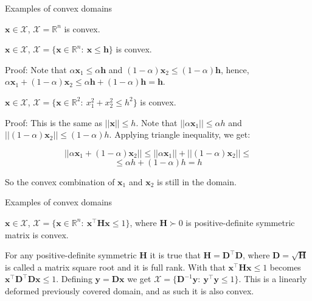\documentclass{beamer}
\begin{document}
\begin{frame}{Examples of convex domains}
	\begin{flushleft}
		
		$\mathbf{x} \in \mathcal{X}$, $\mathcal{X} = \mathbb{R}^n$  is convex.
		
		\bigskip
		
		$\mathbf{x} \in \mathcal{X}$, $\mathcal{X} = \{ \mathbf{x} \in \mathbb{R}^n: \ \mathbf{x} \leq \mathbf{h} \}$ is convex.
		
		\bigskip
		
		Proof: Note that $\alpha \mathbf{x}_1 \leq \alpha \mathbf{h}$ and $(1 - \alpha) \mathbf{x}_2 \leq (1 - \alpha) \mathbf{h}$, hence, $\alpha \mathbf{x}_1 + (1 - \alpha) \mathbf{x}_2 \leq 
		\alpha \mathbf{h} + (1 - \alpha) \mathbf{h} = \mathbf{h}$. \qedsymbol
		
		\bigskip
		
		$\mathbf{x} \in \mathcal{X}$, $\mathcal{X} = \{ \mathbf{x} \in \mathbb{R}^2: \ x_1^2+x_2^2 \leq h^2 \}$ is convex.
		
		\bigskip
		
		Proof: This is the same as $|| \mathbf{x} || \leq h$. Note that $|| \alpha \mathbf{x}_1 || \leq \alpha h$ and $|| (1 - \alpha) \mathbf{x}_2 || \leq (1 - \alpha) h$. Applying triangle inequality, we get:
		
		$$|| \alpha \mathbf{x}_1 + (1 - \alpha) \mathbf{x}_2 || \leq || \alpha \mathbf{x}_1 || + || (1 - \alpha) \mathbf{x}_2 || \leq$$
		$$\leq \alpha h + (1 - \alpha) h = h$$ 
		
		So the convex combination of $\mathbf{x}_1$ and $\mathbf{x}_2$ is still in the domain. \qedsymbol
		
		
	\end{flushleft}
\end{frame}






\begin{frame}{Examples of convex domains}
	\begin{flushleft}
		
		$\mathbf{x} \in \mathcal{X}$, $\mathcal{X} = \{ \mathbf{x} \in \mathbb{R}^n: \ \mathbf{x}^\top \mathbf{H} \mathbf{x} \leq 1 \}$, where $\mathbf{H} \succ 0$ is positive-definite symmetric matrix is convex. 
		
		\bigskip
		
		For any positive-definite symmetric $\mathbf{H}$ it is true that $\mathbf{H} = \mathbf{D}^\top\mathbf{D}$, where $\mathbf{D} = \sqrt{\mathbf{H}}$ is called a matrix square root and it is full rank. With that $\mathbf{x}^\top \mathbf{H} \mathbf{x} \leq 1$ becomes $\mathbf{x}^\top \mathbf{D}^\top\mathbf{D} \mathbf{x} \leq 1$. Defining $\mathbf{y} = \mathbf{D} \mathbf{x}$ we get $\mathcal{X} = \{ \mathbf{D}^{-1}\mathbf{y}: \ \mathbf{y}^\top \mathbf{y} \leq 1 \}$. This is a linearly deformed previously covered domain, and as such it is also convex.
		
	\end{flushleft}
\end{frame}
\end{document}
